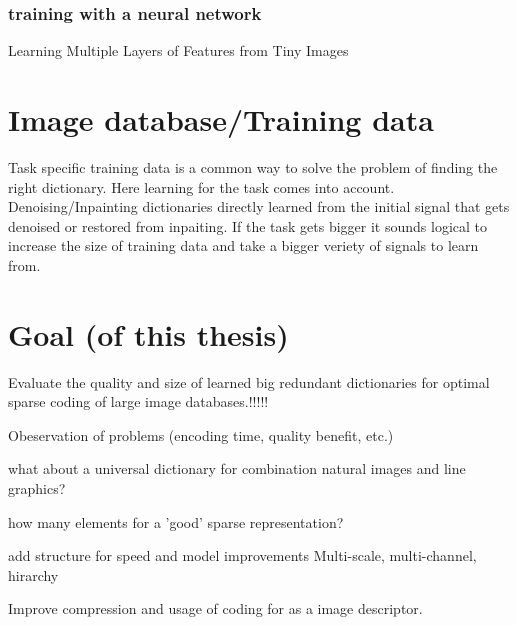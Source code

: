 \subsubsection{training with a neural network}
Learning Multiple Layers of Features from Tiny Images \cite{Krizhevsky2009}


\section{Image database/Training data}
Task specific training data is a common way to solve the problem of finding the right dictionary. 
Here learning for the task comes into account. Denoising/Inpainting dictionaries directly learned from the initial
signal that gets denoised or restored from inpaiting.
If the task gets bigger it sounds logical to increase the size of training data and take a bigger veriety of signals to learn from.


\section{Goal (of this thesis)}
Evaluate the quality and size of learned big redundant dictionaries for 
optimal sparse coding of large image databases.!!!!!

Obeservation of problems (encoding time, quality benefit, etc.)

what about a universal dictionary for combination natural images and line graphics?
 
how many elements for a 'good' sparse representation?

add structure for speed and model improvements
Multi-scale, multi-channel, hirarchy

Improve compression and usage of coding for as a image descriptor.
